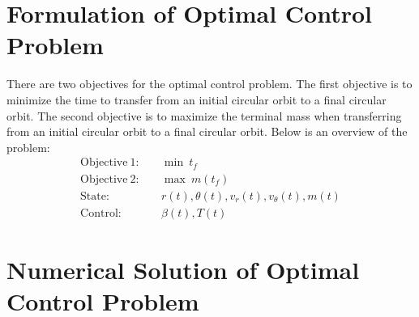 \documentclass[]{article}
\begin{document}
	\section{Formulation of Optimal Control Problem}
There are two objectives for the optimal control problem. The first objective is to minimize the time to transfer from an initial circular orbit to a final circular orbit. The second objective is to maximize the terminal mass when transferring from an initial circular orbit to a final circular orbit.  Below is an overview of the problem:
\begin{align*}
	\mathrm{Objective \ 1}:& \quad \min\ t_f \\
	\mathrm{Objective \ 2}:& \quad \max\ m(t_f) \\
	\mathrm{State}:&     \quad r(t), \theta(t), v_r(t), v_\theta(t), m(t) \\
	\mathrm{Control}:&   \quad \beta(t), T(t)
\end{align*}

	\section{Numerical Solution of Optimal Control Problem}
\end{document}
